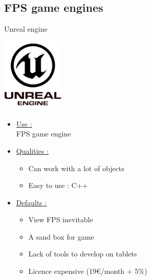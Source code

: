 \documentclass[a4paper,10pt]{beamer}
\begin{document}
		\subsection{FPS game engines}
		
			\begin{frame}{Unreal engine}
				\begin{multicols}{2}
				\includegraphics[height=100pt]{images/logos/Unreal_Engine.png}\\
				
				\columnbreak 
				
				 \begin{itemize}
				 	\item \underline{Use :}\\		
					 FPS game engine	 
					 \item \underline{Qualities :}\\
						 \begin{itemize}
						 	\item Can work with a lot of objects
						 	\item Easy to use : C++
						 \end{itemize}
				 \end{itemize}		 
				\end{multicols}
				\begin{itemize}
					\item \underline{Defaults :}\\
					\begin{itemize}
						\item View FPS inevitable
						\item A sand box for game
						\item Lack of tools to develop on tablets
						\item Licence expensive (19\euro/month + 5\%)
					\end{itemize}
				\end{itemize}
			\end{frame}
			
\end{document}
